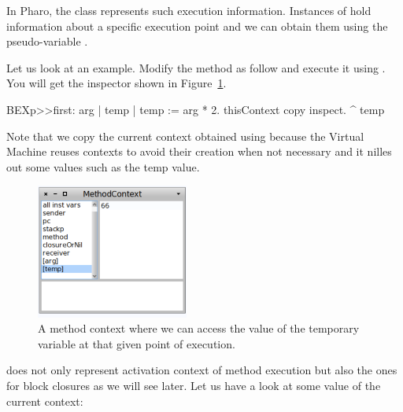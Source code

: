 \documentclass[a4paper,10pt,twoside]{book}
\begin{document}
In Pharo, the class  represents such execution information. Instances of  hold information about a specific execution point and we can obtain them using the pseudo-variable .

Let us look at an example. Modify the method as follow and execute it using . 
You will get the inspector shown in Figure~\ref{oneContext}.

\begin{code}
BEXp>>first: arg
	| temp | 	
	temp := arg * 2.
	thisContext copy inspect.
	^ temp
\end{code}

Note that we copy the current context obtained using  because the Virtual Machine reuses contexts to avoid their creation when not necessary and it nilles out some values such as the temp value.

\begin{figure}[!h]
\begin{center}\includegraphics[width=5cm]{oneContext}
\caption{A method context where we can access the value of the temporary variable  at that given point of execution.\label{oneContext}}
\end{center}
\end{figure}

 does not only represent activation context of method execution but also 
the ones for block closures as we will see later. Let us have a look at some value of the current context:
\end{document}
